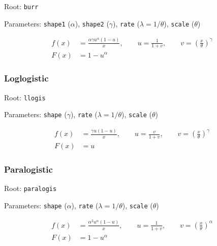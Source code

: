 \documentclass[x11names]{article}
\newcommand{\code}[1]{\texttt{#1}}
\begin{document}
\begin{compactitem}[]
\item Root: \code{burr}
\item Parameters: \code{shape1} ($\alpha$),
      \code{shape2} ($\gamma$),
      \code{rate}   ($\lambda = 1/\theta$),
      \code{scale}  ($\theta$)
\end{compactitem}

\begin{align*}
  f(x) &= \frac{\alpha \gamma u^\alpha (1 - u)}{x},
  \qquad u = \frac{1}{1 + v},
  \qquad v = \left( \frac{x}{\theta} \right)^\gamma \\
  F(x) &= 1 - u^\alpha
\end{align*}

\subsubsection*{Loglogistic}

\begin{compactitem}[]
\item Root: \code{llogis}
\item Parameters: \code{shape} ($\gamma$),
      \code{rate}   ($\lambda = 1/\theta$),
      \code{scale}  ($\theta$)
\end{compactitem}

\begin{align*}
  f(x) &= \frac{\gamma u (1 - u)}{x},
  \qquad u = \frac{v}{1 + v},
  \qquad v = \left( \frac{x}{\theta} \right)^\gamma \\
  F(x) &= u
\end{align*}

\subsubsection*{Paralogistic}

\begin{compactitem}[]
\item Root: \code{paralogis}
\item Parameters: \code{shape} ($\alpha$),
      \code{rate}   ($\lambda = 1/\theta$),
      \code{scale}  ($\theta$)
\end{compactitem}


\begin{align*}
  f(x) &= \frac{\alpha^2 u^\alpha (1 - u)}{x},
  \qquad u = \frac{1}{1 + v},
  \qquad v = \left( \frac{x}{\theta} \right)^\alpha \\
  F(x) &= 1 - u^\alpha
\end{align*}
\end{document}
